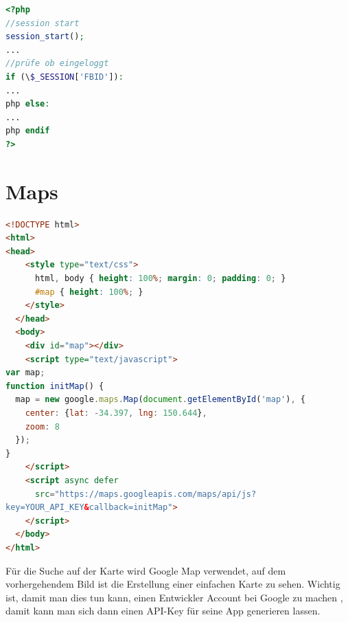 \documentclass[11pt,a4paper]{scrreprt}
\begin{document}
\begin{lstlisting}[language=PHP, frame=single, captionpos=b,caption= search\_list.php]
<?php
//session start
session_start(); 
...
//prüfe ob eingeloggt
if (\$_SESSION['FBID']):
...
php else: 
...
php endif 
?> 
\end{lstlisting}

\section{Maps}
\begin{lstlisting}[language=HTML, frame=single, captionpos=b]
<!DOCTYPE html>
<html>
<head>
    <style type="text/css">
      html, body { height: 100%; margin: 0; padding: 0; }
      #map { height: 100%; }
    </style>
  </head>
  <body>
    <div id="map"></div>
    <script type="text/javascript">
var map;
function initMap() {
  map = new google.maps.Map(document.getElementById('map'), {
    center: {lat: -34.397, lng: 150.644},
    zoom: 8
  });
}
    </script>
    <script async defer
      src="https://maps.googleapis.com/maps/api/js?
key=YOUR_API_KEY&callback=initMap">
    </script>
  </body>
</html>
\end{lstlisting}

\newpage
\noindent
Für die Suche auf der Karte wird Google Map verwendet, auf dem vorhergehendem Bild ist die Erstellung einer einfachen Karte zu sehen. Wichtig ist, damit man dies tun kann, einen Entwickler Account \cite{googledeveloper} bei Google zu machen , damit kann man sich dann einen API-Key für seine App generieren lassen.\\
\end{document}
